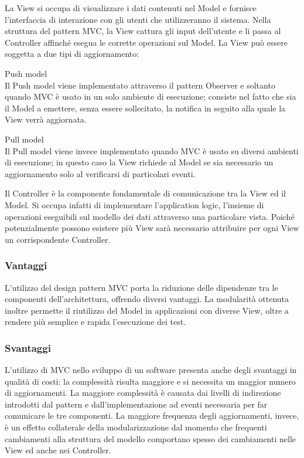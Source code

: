 \documentclass[a4paper, titlepage]{article}
\begin{document}
La View si occupa di visualizzare i dati contenuti nel Model e fornisce l’interfaccia di interazione con gli utenti che utilizzeranno il sistema.
Nella struttura del pattern MVC, la View cattura gli input dell’utente e li passa al Controller affinché esegua le corrette operazioni sul Model.
\newline La View può essere soggetta a due tipi di aggiornamento:
\begin{description}
\item{Push model} 
\\Il Push model viene implementato attraverso il pattern Observer e soltanto quando MVC è usato in un solo ambiente di esecuzione; consiste nel fatto che sia il Model a emettere, senza essere sollecitato, la notifica in seguito alla quale la View verrà aggiornata.
\item{Pull model}
\\Il Pull model viene invece implementato quando MVC è usato su diversi ambienti di esecuzione; in questo caso la View richiede al Model se sia necessario un aggiornamento solo al verificarsi di particolari eventi.
\end{description}

Il Controller è la componente fondamentale di comunicazione tra la View ed il Model. Si occupa infatti di implementare l’application logic, l’insieme di operazioni eseguibili sul modello dei dati attraverso una particolare vista.
\newline Poiché potenzialmente possono esistere più View sarà necessario attribuire per ogni View un corrispondente Controller.

\subsubsection{Vantaggi}
L'utilizzo del design pattern MVC porta la riduzione delle dipendenze tra le componenti dell'architettura, offrendo diversi vantaggi. La modularità ottenuta inoltre permette il riutilizzo del Model in applicazioni con diverse View, oltre a rendere più semplice e rapida l’esecuzione dei test.

\subsubsection{Svantaggi}
L’utilizzo di MVC nello sviluppo di un software presenta anche degli svantaggi in qualità di costi: la complessità risulta maggiore e si necessita un maggior  numero di aggiornamenti.
\newline La maggiore complessità è causata dai livelli di indirezione introdotti dal pattern e dall’implementazione ad eventi necessaria per far comunicare le tre componenti.
\newline La maggiore frequenza degli aggiornamenti, invece, è un effetto collaterale della modularizzazione dal momento che frequenti cambiamenti alla struttura del modello comportano spesso dei cambiamenti nelle View ed anche nei Controller.
\end{document}
